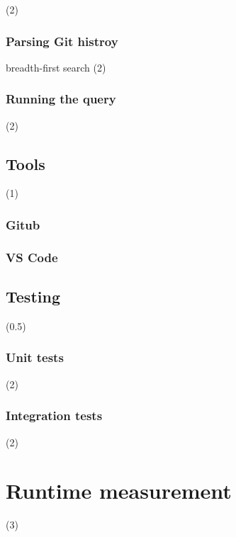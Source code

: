 (2)

\subsection{Parsing Git histroy}

breadth-first search (2)

\subsection{Running the query}

(2)

\section{Tools}

(1)

\subsection{Gitub}

\subsection{VS Code}

\section{Testing}

(0.5)

\subsection{Unit tests}

(2)

\subsection{Integration tests}

(2)

\chapter{Runtime measurement}
\label{appx:simulation}

(3)